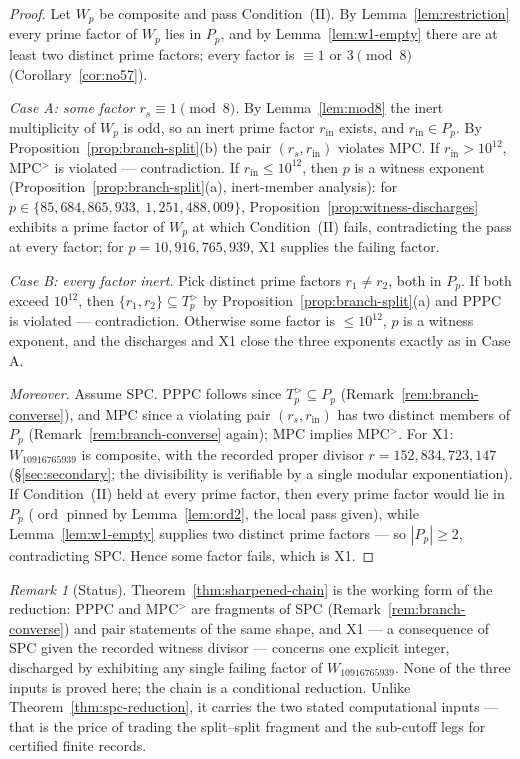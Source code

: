 \documentclass[11pt]{amsart}
\theoremstyle{plain}
\theoremstyle{definition}
\theoremstyle{remark}
\newtheorem{remark}[theorem]{Remark}
\numberwithin{equation}{section}
\newcommand{\ord}{\operatorname{ord}}
\begin{document}
\begin{proof}
Let $W_p$ be composite and pass Condition~(II). By
Lemma~\ref{lem:restriction} every prime factor of $W_p$ lies in $P_p$,
and by Lemma~\ref{lem:w1-empty} there are at least two distinct prime
factors; every factor is $\equiv 1$ or $3 \pmod 8$
(Corollary~\ref{cor:no57}).

\emph{Case A: some factor $r_s \equiv 1 \pmod 8$.} By
Lemma~\ref{lem:mod8} the inert multiplicity of $W_p$ is odd, so an inert
prime factor $r_{\mathrm{in}}$ exists, and $r_{\mathrm{in}} \in P_p$.
By Proposition~\ref{prop:branch-split}(b) the pair
$(r_s, r_{\mathrm{in}})$ violates MPC. If
$r_{\mathrm{in}} > 10^{12}$, MPC$^{>}$ is violated --- contradiction. If
$r_{\mathrm{in}} \leq 10^{12}$, then $p$ is a witness exponent
(Proposition~\ref{prop:branch-split}(a), inert-member analysis): for
$p \in \{85{,}684{,}865{,}933,\ 1{,}251{,}488{,}009\}$,
Proposition~\ref{prop:witness-discharges} exhibits a prime factor of
$W_p$ at which Condition~(II) fails, contradicting the pass at every
factor; for $p = 10{,}916{,}765{,}939$, X1 supplies the failing factor.

\emph{Case B: every factor inert.} Pick distinct prime factors
$r_1 \neq r_2$, both in $P_p$. If both exceed $10^{12}$, then
$\{r_1, r_2\} \subseteq T_p^{>}$ by
Proposition~\ref{prop:branch-split}(a) and PPPC is violated ---
contradiction. Otherwise some factor is $\leq 10^{12}$, $p$ is a witness
exponent, and the discharges and X1 close the three exponents exactly as
in Case A.

\emph{Moreover.} Assume SPC. PPPC follows since
$T_p^{>} \subseteq P_p$ (Remark~\ref{rem:branch-converse}), and MPC
since a violating pair $(r_s, r_{\mathrm{in}})$ has two distinct members
of $P_p$ (Remark~\ref{rem:branch-converse} again); MPC implies
MPC$^{>}$. For X1: $W_{10916765939}$ is composite, with the recorded
proper divisor $r = 152{,}834{,}723{,}147$ (\S\ref{sec:secondary}; the
divisibility is verifiable by a single modular exponentiation). If
Condition~(II) held at every prime factor, then every prime factor
would lie in $P_p$ ($\ord$ pinned by Lemma~\ref{lem:ord2}, the local
pass given), while Lemma~\ref{lem:w1-empty} supplies two distinct prime
factors --- so $|P_p| \geq 2$, contradicting SPC. Hence some factor
fails, which is X1.
\end{proof}

\begin{remark}[Status]\label{rem:sharpened-status}
Theorem~\ref{thm:sharpened-chain} is the working form of the reduction:
PPPC and MPC$^{>}$ are fragments of SPC
(Remark~\ref{rem:branch-converse}) and pair statements of the same
shape, and X1 --- a consequence of SPC given the recorded witness
divisor --- concerns one explicit integer, discharged by exhibiting any
single failing factor of $W_{10916765939}$. None of the three inputs is proved
here; the chain is a conditional reduction. Unlike
Theorem~\ref{thm:spc-reduction}, it carries the two stated computational
inputs --- that is the price of trading the split--split fragment and
the sub-cutoff legs for certified finite records.
\end{remark}
\end{document}
